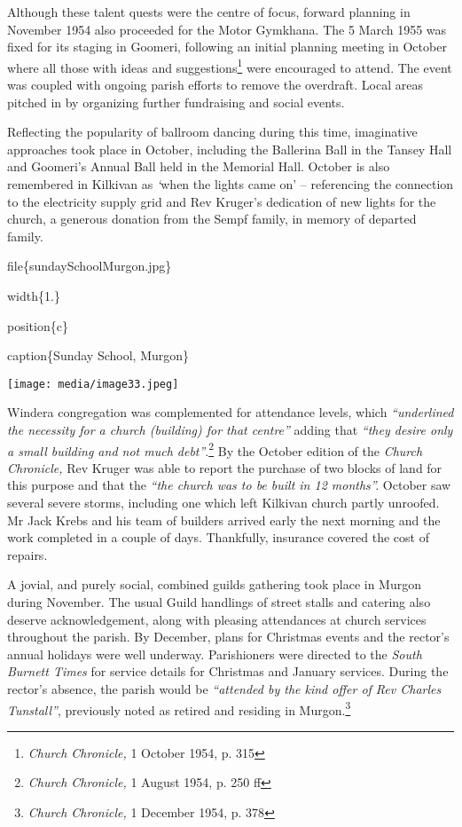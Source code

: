 Although these talent quests were the centre of focus, forward planning in November 1954 also proceeded for the Motor Gymkhana. The 5 March 1955 was fixed for its staging in Goomeri, following an initial planning meeting in October where all those with ideas and suggestions\footnote{\emph{Church Chronicle,} 1 October 1954, p. 315} were encouraged to attend. The event was coupled with ongoing parish efforts to remove the overdraft. Local areas pitched in by organizing further fundraising and social events.

Reflecting the popularity of ballroom dancing during this time, imaginative approaches took place in October, including the Ballerina Ball in the Tansey Hall and Goomeri's Annual Ball held in the Memorial Hall. October is also remembered in Kilkivan as \emph{`}when the lights came on' -- referencing the connection to the electricity supply grid and Rev Kruger's dedication of new lights for the church, a generous donation from the Sempf family, in memory of departed family.

file\{sundaySchoolMurgon.jpg\}

width\{1.\}

position\{c\}

caption\{Sunday School, Murgon\}

\texttt{[image: media/image33.jpeg]}

Windera congregation was complemented for attendance levels, which \emph{``underlined the necessity for a church (building) for that centre''} adding that \emph{``they desire only a small building and not much debt''}.\footnote{\emph{Church Chronicle,} 1 August 1954, p. 250 ff} By the October edition of the \emph{Church Chronicle,} Rev Kruger was able to report the purchase of two blocks of land for this purpose and that the \emph{``the church was to be built in 12 months''.} October saw several severe storms, including one which left Kilkivan church partly unroofed. Mr Jack Krebs and his team of builders arrived early the next morning and the work completed in a couple of days. Thankfully, insurance covered the cost of repairs.

A jovial, and purely social, combined guilds gathering took place in Murgon during November. The usual Guild handlings of street stalls and catering also deserve acknowledgement, along with pleasing attendances at church services throughout the parish. By December, plans for Christmas events and the rector's annual holidays were well underway. Parishioners were directed to the \emph{South Burnett Times} for service details for Christmas and January services. During the rector's absence, the parish would be \emph{``attended by the kind offer of Rev Charles Tunstall''}, previously noted as retired and residing in Murgon.\footnote{\emph{Church Chronicle,} 1 December 1954, p. 378}

